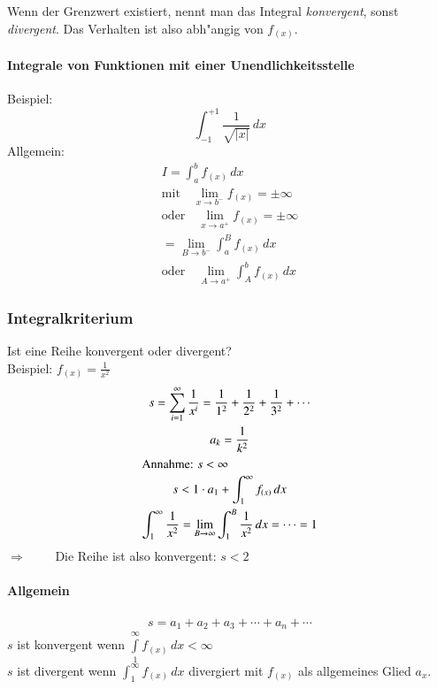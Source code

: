 Wenn der Grenzwert existiert, nennt man das Integral \textit{konvergent}, sonst
\textit{divergent}. Das Verhalten ist also abh"angig von $f_{(x)}$.

\paragraph{Integrale von Funktionen mit einer Unendlichkeitsstelle}
Beispiel:
\begin{equation}
  \int_{-1}^{+1}\frac{1}{\sqrt{|x|}}\,dx
\end{equation}
Allgemein:
\begin{gather}
  I = \int_a^b f_{(x)}\,dx \\
  \text{mit}\quad \lim_{x\rightarrow b^-} f_{(x)} = \pm\infty \\
  \text{oder}\quad \lim_{x\rightarrow a^+} f_{(x)} = \pm\infty \\
  = \lim_{B\rightarrow b^-} \int_a^B f_{(x)}\,dx \\
  \text{oder}\quad \lim_{A\rightarrow a^+}\int_A^b f_{(x)}\,dx
\end{gather}


\subsubsection{Integralkriterium}
Ist eine Reihe konvergent oder divergent? \\
Beispiel: $f_{(x)} = \frac{1}{x^2}$
\begin{gather}
  s = \sum_{i=1}^\infty \frac{1}{x^i} = \frac{1}{1^2} + \frac{1}{2^2} + \frac{1}{3^2} + \cdots \\
  a_k = \frac{1}{k^2} \\
\intertext{Annahme: $s < \infty$}
  s < 1\cdot a_1 + \int_1^\infty f_{(x)}\,dx \\
  \int_1^\infty \frac{1}{x^2} = \lim_{B\rightarrow\infty}\int_1^B\frac{1}{x^2}\,dx = \cdots = 1
\end{gather}
$\Longrightarrow\qquad$ Die Reihe ist also konvergent: $s<2$

\paragraph{Allgemein}
\begin{gather}
  s = a_1 + a_2 + a_3 + \cdots + a_n + \cdots
\end{gather}
$s$ ist konvergent wenn $\int\limits_1^\infty f_{(x)}\,dx < \infty$ \\
$s$ ist divergent wenn $\int_1^\infty f_{(x)}\,dx$ divergiert mit $f_{(x)}$
als allgemeines Glied $a_x$.


